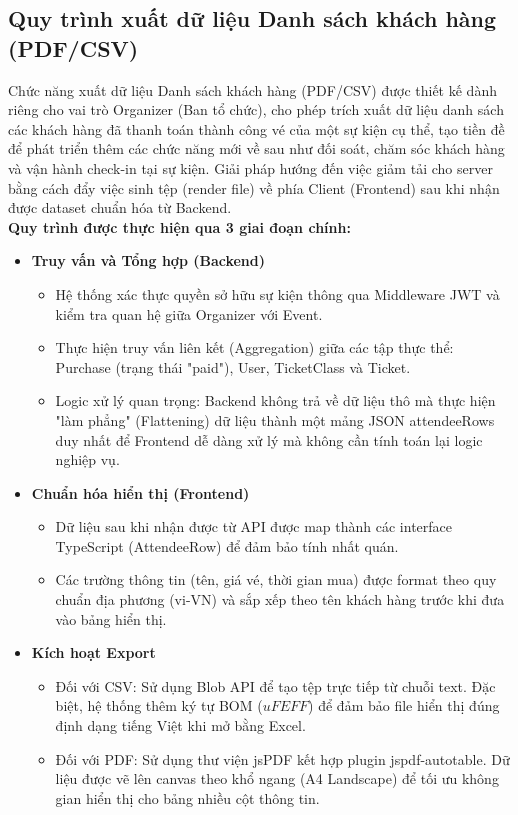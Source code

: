 \subsection{Quy trình xuất dữ liệu Danh sách khách hàng (PDF/CSV)}
Chức năng xuất dữ liệu Danh sách khách hàng (PDF/CSV) được thiết kế dành riêng cho vai trò Organizer (Ban tổ chức), 
cho phép trích xuất dữ liệu danh sách các khách hàng đã thanh toán thành công vé của một sự kiện cụ thể, tạo tiền đề để phát triển thêm các chức năng mới về sau như đối soát, 
chăm sóc khách hàng và vận hành check-in tại sự kiện. 
Giải pháp hướng đến việc giảm tải cho server bằng cách đẩy việc sinh tệp (render file) về phía Client (Frontend) sau khi nhận được dataset chuẩn hóa từ Backend.\\
\textbf{Quy trình được thực hiện qua 3 giai đoạn chính:}
\begin{itemize}
    \item[1.] \textbf{Truy vấn và Tổng hợp (Backend)}
    \begin{itemize}
        \item[-] Hệ thống xác thực quyền sở hữu sự kiện thông qua Middleware JWT và kiểm tra quan hệ giữa Organizer với Event.
        \item[-] Thực hiện truy vấn liên kết (Aggregation) giữa các tập thực thể: Purchase (trạng thái "paid"), User, TicketClass và Ticket.
        \item[-] Logic xử lý quan trọng: Backend không trả về dữ liệu thô mà thực hiện "làm phẳng" (Flattening) dữ liệu thành một mảng JSON attendeeRows duy nhất để Frontend dễ dàng xử lý mà không cần tính toán lại logic nghiệp vụ.
    \end{itemize}
    \item[2.] \textbf{Chuẩn hóa hiển thị (Frontend)}
    \begin{itemize}
        \item[-] Dữ liệu sau khi nhận được từ API được map thành các interface TypeScript (AttendeeRow) để đảm bảo tính nhất quán.
        \item[-] Các trường thông tin (tên, giá vé, thời gian mua) được format theo quy chuẩn địa phương (vi-VN) và sắp xếp theo tên khách hàng trước khi đưa vào bảng hiển thị.
    \end{itemize}
    \item[3.] \textbf{Kích hoạt Export}
    \begin{itemize}
        \item[-] Đối với CSV: Sử dụng Blob API để tạo tệp trực tiếp từ chuỗi text. Đặc biệt, hệ thống thêm ký tự BOM ($uFEFF$) để đảm bảo file hiển thị đúng định dạng tiếng Việt khi mở bằng Excel.
        \item[-] Đối với PDF: Sử dụng thư viện jsPDF kết hợp plugin jspdf-autotable. Dữ liệu được vẽ lên canvas theo khổ ngang (A4 Landscape) để tối ưu không gian hiển thị cho bảng nhiều cột thông tin.
    \end{itemize}
\end{itemize}
